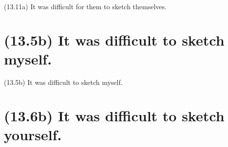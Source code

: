 \documentclass{article}
\begin{document}
\bigbreak
\begin{enumerate*}
\item[(13.11a)] It was difficult for them to sketch themselves.
\end{enumerate*}
\bigbreak

\bigbreak
\begin{minipage}{\textwidth}
\end{minipage}
\bigbreak

\clearpage

%
%

\section*{(13.5b) It was difficult to sketch myself.}

\bigbreak
\begin{enumerate*}
\item[(13.5b)] It was difficult to sketch myself.
\end{enumerate*}
\bigbreak

\bigbreak
\begin{minipage}{\textwidth}
\end{minipage}
\bigbreak

\clearpage

%
%

\section*{(13.6b) It was difficult to sketch yourself.}
\end{document}

